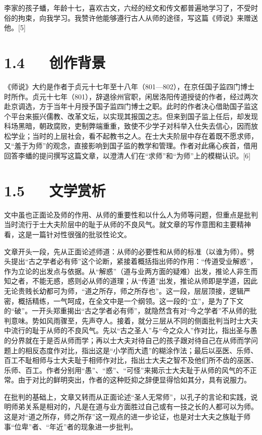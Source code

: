 \documentclass[letterpaper,10pt,english]{sphinxmanual}
\begin{document}
李家的孩子蟠，年龄十七，喜欢古文，六经的经文和传文都普遍地学习了，不受时俗的拘束，向我学习。我赞许他能够遵行古人从师的途径，写这篇《师说》来赠送他。{[}5{]}


\section{1.4   创作背景}
\label{\detokenize{p01_u6563_u6587/_u97e9_u6108-_u5e08_u8bf4:id6}}
《师说》大约是作者于贞元十七年至十八年（801—802），在京任国子监四门博士时所作。贞元十七年（801），辞退徐州官职，闲居洛阳传道授徒的作者，经过两次赴京调选，方于当年十月授予国子监四门博士之职。此时的作者决心借助国子监这个平台来振兴儒教、改革文坛，以实现其报国之志。但来到国子监上任后，却发现科场黑暗，朝政腐败，吏制弊端重重，致使不少学子对科举入仕失去信心，因而放松学业；当时的上层社会，看不起教书之人。在士大夫阶层中存在着既不愿求师，又“羞于为师”的观念，直接影响到国子监的教学和管理。作者对此痛心疾首，借用回答李蟠的提问撰写这篇文章，以澄清人们在“求师”和“为师”上的模糊认识。{[}6{]}


\section{1.5   文学赏析}
\label{\detokenize{p01_u6563_u6587/_u97e9_u6108-_u5e08_u8bf4:id7}}
文中虽也正面论及师的作用、从师的重要性和以什么人为师等问题，但重点是批判当时流行于士大夫阶层中的耻于从师的不良风气。就文章的写作意图和主要精神看，这是一篇针对性很强的批驳性论文。

文章开头一段，先从正面论述师道：从师的必要性和从师的标准（以谁为师）。劈头提出“古之学者必有师”这个论断，紧接着概括指出师的作用：“传道受业解惑”，作为立论的出发点与依据。从“解惑”（道与业两方面的疑难）出发，推论人非生而知之者，不能无惑，惑则必从师的道理；从“传道”出发，推论从师即是学道，因此无论贵贱长幼都可为师，“道之所存，师之所存也”。这一段，层层顶接，逻辑严密，概括精练，一气呵成，在全文中是一个纲领。这一段的“立”，是为了下文的“破”。一开头郑重揭出“古之学者必有师”，就隐然含有对“今之学者”不从师的批判意味。势如风雨骤至，先声夺人。接着，就分三层从不同的侧面批判当时士大夫中流行的耻于从师的不良风气。先以“古之圣人”与“今之众人”作对比，指出圣与愚的分界就在于是否从师而学；再以士大夫对待自己的孩子跟对待自己在从师而学问题上的相反态度作对比，指出这是“小学而大遗”的糊涂作法；最后以巫医、乐师、百工不耻相师与士大夫耻于相师作对比，指出士大夫之智不及他们所不齿的巫医、乐师、百工。作者分别用“愚”、“惑”、“可怪”来揭示士大夫耻于从师的风气的不正常。由于对比的鲜明突出，作者的这种贬抑之辞便显得恰如其分，具有说服力。

在批判的基础上，文章又转而从正面论述“圣人无常师”，以孔子的言论和实践，说明师弟关系是相对的，凡是在道与业方面胜过自己或有一技之长的人都可以为师。这是对“道之所存，师之所存”这一观点的进一步论证，也是对士大夫之族耻于师事“位卑”者、“年近”者的现象进一步批判。
\end{document}
